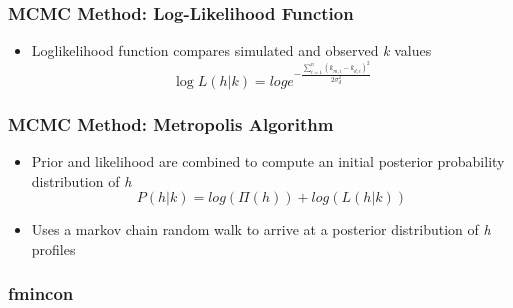 \documentclass[7pt]{beamer}
\begin{document}
\begin{frame}
 \frametitle{MCMC Method: Log-Likelihood Function}
\begin{itemize}
\item Loglikelihood function compares simulated and observed \textit{k} values
\begin{equation} \label{likely}
\log{L(h|%
k)}=log{e^{- \frac{\sum\limits_{i=1}^n({k}_{m,i}-k_{d,i})^2}{2\sigma_{d}^2}}}
\end{equation} 

\end{itemize}
\end{frame}

\begin{frame}
 \frametitle{MCMC Method: Metropolis Algorithm}
\begin{itemize}
\item Prior and likelihood are combined to compute an initial posterior probability distribution of \textit{h}\\
\begin{equation}\label{post}
P(h|%
k) = log(\Pi(h)) + log(L(h|%
k))
\end{equation}
\item Uses a markov chain random walk to %
arrive at a posterior distribution of \textit{h} profiles %
\end{itemize}
\end{frame}

 \begin{frame}
\frametitle{fmincon}


\end{frame}
\end{document}
